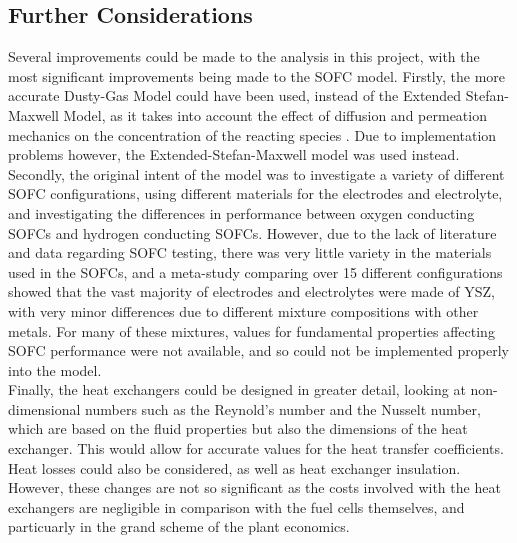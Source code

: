 \documentclass{article}
\begin{document}


\subsection{Further Considerations}

Several improvements could be made to the analysis in this project, with the most significant improvements being made to the SOFC model. Firstly, the more accurate Dusty-Gas Model could have been used, instead of the Extended Stefan-Maxwell Model, as it takes into account the effect of diffusion and permeation mechanics on the concentration of the reacting species \cite{LM3}. Due to implementation problems however, the Extended-Stefan-Maxwell model was used instead.\\
Secondly, the original intent of the model was to investigate a variety of different SOFC configurations, using different materials for the electrodes and electrolyte, and investigating the differences in performance between oxygen conducting SOFCs and hydrogen conducting SOFCs. However, due to the lack of literature and data regarding SOFC testing, there was very little variety in the materials used in the SOFCs, and a meta-study \cite{MD} comparing over 15 different configurations showed that the vast majority of electrodes and electrolytes were made of YSZ, with very minor differences due to different mixture compositions with other metals. For many of these mixtures, values for fundamental properties affecting SOFC performance were not available, and so could not be implemented properly into the model.\\
Finally, the heat exchangers could be designed in greater detail, looking at non-dimensional numbers such as the Reynold's number and the Nusselt number, which are based on the fluid properties but also the dimensions of the heat exchanger. This would allow for accurate values for the heat transfer coefficients. Heat losses could also be considered, as well as heat exchanger insulation. However, these changes are not so significant as the costs involved with the heat exchangers are negligible in comparison with the fuel cells themselves, and particuarly in the grand scheme of the plant economics.




\end{document}
